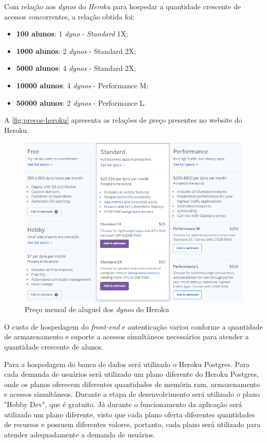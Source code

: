 Com relação aos \textit{\glspl{dyno}} do \textit{Heroku} para hospedar a quantidade crescente de acessos concorrentes, a relação obtida foi:
\begin{itemize}
    \item \textbf{100 alunos}: 1 \textit{\gls{dyno}} - \textit{Standard} 1X;
    \item \textbf{1000 alunos}: 2 \textit{\glspl{dyno}} - Standard 2X;
    \item \textbf{5000 alunos}: 4 \textit{\glspl{dyno}} - Standard 2X;
    \item \textbf{10000 alunos}: 4 \textit{\glspl{dyno}} - Performance M;
    \item \textbf{50000 alunos}: 2 \textit{\glspl{dyno}} - Performance L.
\end{itemize}

A \autoref{fig:precos-heroku} apresenta as relações de preço presentes no website do Heroku.

\begin{figure}[htb]
    \centering
	\includegraphics[width=16cm]{imagens/precos-heroku.png}
	\caption{\label{fig:precos-heroku} Preço mensal de aluguel dos \textit{\glspl{dyno}} do Heroku}
\end{figure}

O custo de hospedagem do \textit{\gls{front-end}} e autenticação variou conforme a quantidade de armazenamento e suporte a acessos simultâneos necessários para atender a quantidade crescente de alunos.

Para a hospedagem do banco de dados será utilizado o Heroku Postgres. Para cada demanda de usuários será utilizado um plano diferente do Heroku Postgres, onde os planos oferecem diferentes quantidades de memória \ac{ram}, armazenamento e acessos simultâneos. Durante a etapa de desenvolvimento será utilizado o plano "Hobby Dev", que é gratuito. Já durante o funcionamento da aplicação será utilizado um plano diferente, visto que cada plano oferta diferentes quantidades de recursos e possuem diferentes valores, portanto, cada plano será utilizado para atender adequadamente a demanda de usuários.

